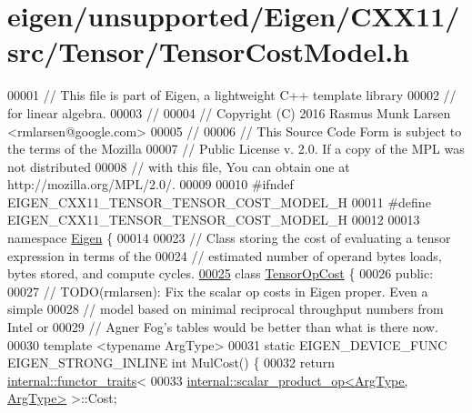 \hypertarget{eigen_2unsupported_2_eigen_2_c_x_x11_2src_2_tensor_2_tensor_cost_model_8h_source}{}\section{eigen/unsupported/\+Eigen/\+C\+X\+X11/src/\+Tensor/\+Tensor\+Cost\+Model.h}
\label{eigen_2unsupported_2_eigen_2_c_x_x11_2src_2_tensor_2_tensor_cost_model_8h_source}

\begin{DoxyCode}
00001 \textcolor{comment}{// This file is part of Eigen, a lightweight C++ template library}
00002 \textcolor{comment}{// for linear algebra.}
00003 \textcolor{comment}{//}
00004 \textcolor{comment}{// Copyright (C) 2016 Rasmus Munk Larsen <rmlarsen@google.com>}
00005 \textcolor{comment}{//}
00006 \textcolor{comment}{// This Source Code Form is subject to the terms of the Mozilla}
00007 \textcolor{comment}{// Public License v. 2.0. If a copy of the MPL was not distributed}
00008 \textcolor{comment}{// with this file, You can obtain one at http://mozilla.org/MPL/2.0/.}
00009 
00010 \textcolor{preprocessor}{#ifndef EIGEN\_CXX11\_TENSOR\_TENSOR\_COST\_MODEL\_H}
00011 \textcolor{preprocessor}{#define EIGEN\_CXX11\_TENSOR\_TENSOR\_COST\_MODEL\_H}
00012 
00013 \textcolor{keyword}{namespace }\hyperlink{namespace_eigen}{Eigen} \{
00014 
00023 \textcolor{comment}{// Class storing the cost of evaluating a tensor expression in terms of the}
00024 \textcolor{comment}{// estimated number of operand bytes loads, bytes stored, and compute cycles.}
\hyperlink{class_eigen_1_1_tensor_op_cost}{00025} \textcolor{keyword}{class }\hyperlink{class_eigen_1_1_tensor_op_cost}{TensorOpCost} \{
00026  \textcolor{keyword}{public}:
00027   \textcolor{comment}{// TODO(rmlarsen): Fix the scalar op costs in Eigen proper. Even a simple}
00028   \textcolor{comment}{// model based on minimal reciprocal throughput numbers from Intel or}
00029   \textcolor{comment}{// Agner Fog's tables would be better than what is there now.}
00030   \textcolor{keyword}{template} <\textcolor{keyword}{typename} ArgType>
00031   \textcolor{keyword}{static} EIGEN\_DEVICE\_FUNC EIGEN\_STRONG\_INLINE \textcolor{keywordtype}{int} MulCost() \{
00032     \textcolor{keywordflow}{return} \hyperlink{struct_eigen_1_1internal_1_1functor__traits}{internal::functor\_traits}<
00033         \hyperlink{struct_eigen_1_1internal_1_1scalar__product__op}{internal::scalar\_product\_op<ArgType, ArgType>} >::Cost;

\end{DoxyCode}
